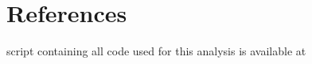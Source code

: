 \documentclass[12pt]{article}\usepackage[]{graphicx}\usepackage[]{color}
\begin{document}
\newpage
\section{References}
\begingroup
\renewcommand{\section}[2]{}%
\begin{flushleft}

%
%
%
%

\end{flushleft}
\endgroup

\newpage
\section{Appendix - R Code}

A script containing all code used for this analysis is available at \\

\singlespacing
\end{document}
